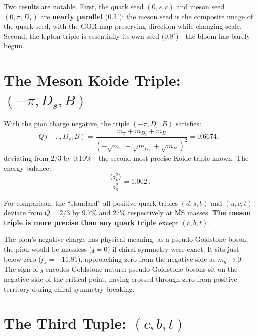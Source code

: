 \documentclass[12pt,a4paper]{article}
\newcommand{\zch}{\mathfrak{z}}
\begin{document}
Two results are notable. First, the quark seed $(0,s,c)$ and meson 
seed $(0,\pi,D_s)$ are \textbf{nearly parallel} ($0.3^\circ$): the 
meson seed is the composite image of the quark seed, with the GOR 
map preserving direction while changing scale. Second, the lepton 
triple is essentially its own seed ($0.8^\circ$)---the bloom has 
barely begun.


\section{The Meson Koide Triple: $(-\pi, D_s, B)$}
\label{sec:mesonkoide}

With the pion charge negative, the triple $(-\pi, D_s, B)$ satisfies:
\begin{equation}
Q(-\pi, D_s, B) = 
\frac{m_\pi + m_{D_s} + m_B}{(-\sqrt{m_\pi} + \sqrt{m_{D_s}} + \sqrt{m_B})^2}
= 0.6674\,,
\end{equation}
deviating from $2/3$ by $0.10\%$---the second most precise Koide 
triple known. The energy balance:
\begin{equation}
\frac{\langle z_k^2\rangle}{z_0^2} = 1.002\,.
\end{equation}

For comparison, the ``standard'' all-positive quark triples $(d,s,b)$ 
and $(u,c,t)$ deviate from $Q = 2/3$ by 9.7\% and 27\% respectively 
at $\overline{\text{MS}}$ masses. \textbf{The meson triple is more 
precise than any quark triple} except $(c,b,t)$.

The pion's negative charge has physical meaning: as a pseudo-Goldstone 
boson, the pion would be massless ($\zch = 0$) if chiral symmetry were 
exact. It sits just below zero ($\zch_\pi = -11.81$), approaching zero 
from the negative side as $m_q \to 0$. The sign of $\zch$ encodes 
Goldstone nature: pseudo-Goldstone bosons sit on the negative side 
of the critical point, having crossed through zero from positive 
territory during chiral symmetry breaking.

\section{The Third Tuple: $(c, b, t)$}
\label{sec:cbt}
\end{document}
